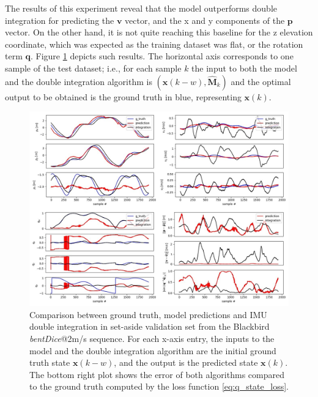 The results of this experiment reveal that the model outperforms double integration for predicting the $\mathbf{v}$ vector, and the x and y components of the $\mathbf{p}$ vector.
On the other hand, it is not quite reaching this baseline for the z elevation coordinate, which was expected as the training dataset was flat, or the rotation term $\mathbf{q}$.
Figure \ref{fig:imu_int_50} depicts such results.
The horizontal axis corresponds to one sample of the test dataset; i.e., for each sample $k$ the input to both the model and the double integration algorithm is $(\mathbf{x}(k-w), \mathbf{\hat{M}}_k)$ and the optimal output to be obtained is the ground truth in blue, representing $\mathbf{x}(k)$.
\begin{figure}
    \centering
    \includegraphics[width=\textwidth,height=\textheight,keepaspectratio]{thesis_template/img/imu_int_50.jpg} 
    \caption{Comparison between ground truth, model predictions and IMU double integration in set-aside validation set from the Blackbird \emph{bentDice}@2m/s sequence. For each x-axis entry, the inputs to the model and the double integration algorithm are the initial ground truth state $\mathbf{x}(k-w)$, and the output is the predicted state $\mathbf{x}(k)$. 
    The bottom right plot shows the error of both algorithms compared to the ground truth computed by the loss function \ref{eq:q_state_loss}.}
    \label{fig:imu_int_50}
\end{figure}

